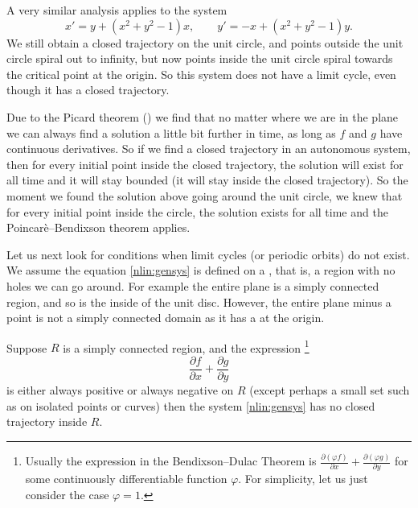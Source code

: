 A very similar analysis applies to the system
\begin{equation*}
x' = y + {(x^2+y^2-1)} x, \qquad
y' = -x + {(x^2+y^2-1)} y.
\end{equation*}
We still obtain a closed trajectory on the unit circle, and
points outside the unit circle spiral out to infinity, but now points
inside the unit circle spiral towards the critical point at the origin.
So this system does not have a limit cycle, even though it has a closed
trajectory.

Due to the Picard theorem () we find that no matter
where we are in the plane we can always find a solution a little bit
further in time,
as long as $f$ and $g$ have continuous derivatives.  So 
if we find a closed trajectory in an autonomous system,
then for every initial point inside
the closed trajectory, the solution will exist for all time and it will stay
bounded (it will stay inside the closed trajectory).  So the moment
we found the solution above going around the unit circle, we knew that for
every initial point inside the circle, the solution exists for all time and
the Poincar\`e--Bendixson theorem applies.

\medskip

Let us next look for conditions when limit cycles (or periodic orbits) do not exist.
We assume
the equation \eqref{nlin:gensys} is defined on a
\emph{}, that is, a region with no holes
we can go around.  For example the entire plane is a simply
connected region, and so is the inside of the unit disc.  However,
the entire plane minus a point is not a simply connected domain as it has a
 at the origin.

\begin{theorem}%
Suppose $R$ is a simply connected region,
and the expression%
\footnote{Usually the expression in the Bendixson--Dulac Theorem is
$\frac{\partial (\varphi f)}{\partial x} + \frac{\partial (\varphi
g)}{\partial y}$
for some continuously differentiable function $\varphi$.  For simplicity,
let us just consider the case $\varphi = 1$.}
\begin{equation*}
\frac{\partial f}{\partial x} + \frac{\partial g}{\partial y}
\end{equation*}
is either always positive or always negative
on $R$ (except perhaps a small set such as on isolated points or curves)
then the system \eqref{nlin:gensys}
has no closed trajectory inside $R$.
\end{theorem}

